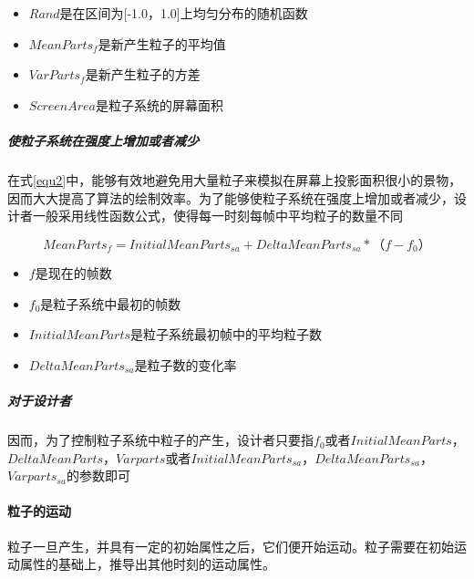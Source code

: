 \documentclass[UTF8,a4paper,14pt]{ctexart}
\begin{document}
				\begin{itemize}
					\item $Rand$是在区间为[-1.0，1.0]上均匀分布的随机函数
					\item $MeanParts_f$是新产生粒子的平均值
					\item $VarParts_f$是新产生粒子的方差
					\item $ScreenArea$是粒子系统的屏幕面积
				\end{itemize}
				
			\subparagraph{使粒子系统在强度上增加或者减少}
				在式\ref{equ2}中，能够有效地避免用大量粒子来模拟在屏幕上投影面积很小的景物，因而大大提高了算法的绘制效率。为了能够使粒子系统在强度上增加或者减少，设计者一般采用线性函数公式，使得每一时刻每帧中平均粒子的数量不同
				
				\begin{equation}\label{equ3}
				MeanParts_f=InitialMeanParts_{sa}+DeltaMeanParts_{sa}*（f-f_0）
				\end{equation}
				
				\begin{itemize}
					\item $f$是现在的帧数
					\item $f_0$是粒子系统中最初的帧数
					\item $InitialMeanParts$是粒子系统最初帧中的平均粒子数
					\item $DeltaMeanParts_{sa}$是粒子数的变化率
				\end{itemize}
				
			\subparagraph{对于设计者}因而，为了控制粒子系统中粒子的产生，设计者只要指$f_0$或者$InitialMeanParts$，$DeltaMeanParts$，$Varparts$或者$InitialMeanParts_{sa}$，$DeltaMeanParts_{sa}$，$Varparts_{sa}$的参数即可
				
		\paragraph{粒子的运动}
			粒子一旦产生，并具有一定的初始属性之后，它们便开始运动。粒子需要在初始运动属性的基础上，推导出其他时刻的运动属性。
			
\end{document}
